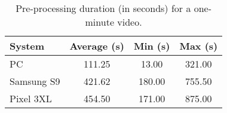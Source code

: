 \begin{table}[t]
\caption{Pre-processing duration (in seconds) for a one-minute video.}
\centering
\begin{tabular}{|l|c|c|c|}
\hline
\textbf{System} & \textbf{Average (s)} & \textbf{Min (s)} & \textbf{Max (s)} \\
\hline
PC              & 111.25 & 13.00 & 321.00 \\
Samsung S9      & 421.62 & 180.00 & 755.50 \\
Pixel 3XL       & 454.50 & 171.00 & 875.00 \\
\hline
\end{tabular}
\label{table:preprocessing_times}
\end{table}
 